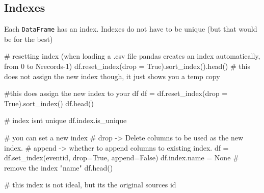 \documentclass[
  letterpaper,
  DIV=11,
  numbers=noendperiod]{scrreprt}
\newenvironment{Shaded}{\begin{snugshade}}{\end{snugshade}}
\newcommand{\CommentTok}[1]{\textcolor[rgb]{0.37,0.37,0.37}{#1}}
\newcommand{\NormalTok}[1]{\textcolor[rgb]{0.00,0.23,0.31}{#1}}
\newcommand{\OperatorTok}[1]{\textcolor[rgb]{0.37,0.37,0.37}{#1}}
\newcommand{\StringTok}[1]{\textcolor[rgb]{0.13,0.47,0.30}{#1}}
\newcommand{\VariableTok}[1]{\textcolor[rgb]{0.07,0.07,0.07}{#1}}
\begin{document}
\hypertarget{indexes}{%
\subsection{Indexes}\label{indexes}}

Each \texttt{DataFrame} has an index. Indexes do not have to be unique
(but that would be for the best)

\begin{Shaded}
\begin{Highlighting}[]
\CommentTok{\# resetting index (when loading a .csv file pandas creates an index automatically, from 0 to Nrecords{-}1)}
\NormalTok{df.reset\_index(drop }\OperatorTok{=} \VariableTok{True}\NormalTok{).sort\_index().head() }\CommentTok{\# this does not assign the new index though, it just shows you a temp copy}
\end{Highlighting}
\end{Shaded}

\begin{Shaded}
\begin{Highlighting}[]
\CommentTok{\#this does assign the new index to your df}
\NormalTok{df }\OperatorTok{=}\NormalTok{ df.reset\_index(drop }\OperatorTok{=} \VariableTok{True}\NormalTok{).sort\_index() }
\NormalTok{df.head()}
\end{Highlighting}
\end{Shaded}

\begin{Shaded}
\begin{Highlighting}[]
\CommentTok{\# index isn\textquotesingle{}t unique}
\NormalTok{df.index.is\_unique}
\end{Highlighting}
\end{Shaded}

\begin{Shaded}
\begin{Highlighting}[]
\CommentTok{\# you can set a new index}
\CommentTok{\# drop {-}\textgreater{} Delete columns to be used as the new index.}
\CommentTok{\# append {-}\textgreater{}  whether to append columns to existing index.}
\NormalTok{df }\OperatorTok{=}\NormalTok{ df.set\_index(}\StringTok{\textquotesingle{}eventid\textquotesingle{}}\NormalTok{, drop}\OperatorTok{=}\VariableTok{True}\NormalTok{, append}\OperatorTok{=}\VariableTok{False}\NormalTok{)}
\NormalTok{df.index.name }\OperatorTok{=} \VariableTok{None} \CommentTok{\# remove the index "name"}
\NormalTok{df.head()}

\CommentTok{\# this index is not ideal, but it\textquotesingle{}s the original source\textquotesingle{}s id}
\end{Highlighting}
\end{Shaded}
\end{document}
